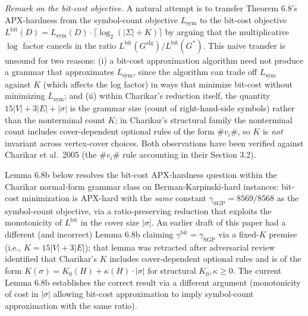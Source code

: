 \documentclass[
]{article}
\begin{document}
\emph{Remark on the bit-cost objective.} A natural attempt is to
transfer Theorem 6.8's APX-hardness from the symbol-count
objective $L_{\mathrm{sym}}$ to the bit-cost objective
$L^{\mathrm{bit}}(D) = L_{\mathrm{sym}}(D) \cdot
\lceil \log_2(|\Sigma|+K) \rceil$ by arguing that the
multiplicative $\log$ factor cancels in the ratio
$L^{\mathrm{bit}}(G^{\mathrm{alg}})/L^{\mathrm{bit}}(G^*)$. This
naive transfer is unsound for two reasons: (i) a bit-cost
approximation algorithm need not produce a grammar that approximates
$L_{\mathrm{sym}}$, since the algorithm can trade off
$L_{\mathrm{sym}}$ against $K$ (which affects the log factor) in
ways that minimize bit-cost without minimizing $L_{\mathrm{sym}}$;
and (ii) within Charikar's reduction itself, the quantity
$15|V| + 3|E| + |\sigma|$ is the grammar size (count of
right-hand-side symbols) rather than the nonterminal count $K$;
in Charikar's structural family the nonterminal count includes
cover-dependent optional rules of the form $\#v_i\#$, so $K$ is
\emph{not} invariant across vertex-cover choices. Both observations
have been verified against Charikar et al.\ 2005 (the
$\#v_i\#$ rule accounting in their Section 3.2).

Lemma 6.8b below resolves the bit-cost APX-hardness question within
the Charikar normal-form grammar class on Berman-Karpinski-hard
instances: bit-cost minimization is APX-hard with the \emph{same}
constant $\gamma_{\mathrm{SGP}} = 8569/8568$ as the symbol-count
objective, via a ratio-preserving reduction that exploits the
monotonicity of $L^{\mathrm{bit}}$ in the cover size $|\sigma|$. An
earlier draft of this paper had a different (and incorrect) Lemma
6.8b claiming $\gamma^{\mathrm{bit}} = \gamma_{\mathrm{SGP}}$ via a
fixed-$K$ premise (i.e., $K = 15|V| + 3|E|$); that lemma was
retracted after adversarial review identified that Charikar's $K$
includes cover-dependent optional rules and is of the form
$K(\sigma) = K_0(H) + \kappa(H) \cdot |\sigma|$ for structural
$K_0, \kappa \geq 0$. The current Lemma 6.8b establishes the correct
result via a different argument (monotonicity of cost in $|\sigma|$
allowing bit-cost approximation to imply symbol-count approximation
with the same ratio).
\end{document}
